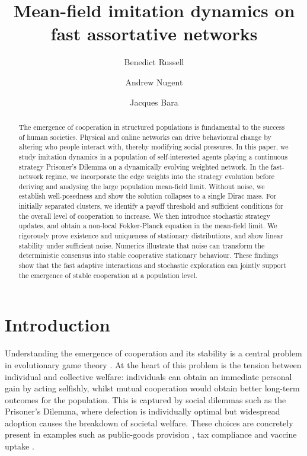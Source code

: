 \documentclass[10pt]{article}
\title{Mean-field imitation dynamics on fast assortative networks}
\author[1]{Benedict Russell}
\author[2]{Andrew Nugent}
\author[3, 4]{Jacques Bara}
\affil[1]{Mathematics Institute, University of Warwick}
\affil[2]{Department of Mathematics, University College London}
\affil[3]{Center for Development Research, University of Bonn}
\affil[4]{Transdisciplinary Research Area Sustainable Futures, University of Bonn}
\begin{document}
\date{}
\maketitle


\begin{abstract}
The emergence of cooperation in structured populations is fundamental to the success of human societies. Physical and online networks can drive behavioural change by altering who people interact with, thereby modifying social pressures. In this paper, we study imitation dynamics in a population of self-interested agents playing a continuous strategy Prisoner's Dilemma on a dynamically evolving weighted network. In the fast-network regime, we incorporate the edge weights into the strategy evolution before deriving and analysing the large population mean-field limit. Without noise, we establish well-posedness and show the solution collapses to a single Dirac mass. For initially separated clusters, we identify a payoff threshold and sufficient conditions for the overall level of cooperation to increase. We then introduce stochastic strategy updates, and obtain a non-local Fokker-Planck equation in the mean-field limit. We rigorously prove existence and uniqueness of stationary distributions, and show linear stability under sufficient noise. Numerics illustrate that noise can transform the deterministic consensus into stable cooperative stationary behaviour. These findings show that the fast adaptive interactions and stochastic exploration can jointly support the emergence of stable cooperation at a population level.
\end{abstract}

\section{Introduction}
Understanding the emergence of cooperation and its stability is a central problem in evolutionary game theory \cite{nowak_five_2006}. At the heart of this problem is the tension between individual and collective welfare: individuals can obtain an immediate personal gain by acting selfishly, whilst mutual cooperation would obtain better long-term outcomes for the population. This is captured by social dilemmas such as the Prisoner's Dilemma, where defection is individually optimal but widespread adoption causes the breakdown of societal welfare. These choices are concretely present in examples such as public-goods provision \cite{conybeare_public_1984}, tax compliance \cite{gottlieb_tax_1985} and vaccine uptake \cite{kabir_how_2021}.
\end{document}
